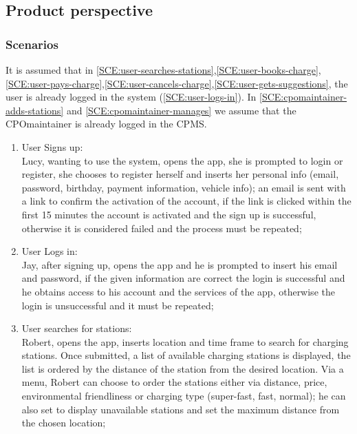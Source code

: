 \subsection{Product perspective}

\subsubsection{Scenarios}
It is assumed that in \ref{SCE:user-searches-stations},\ref{SCE:user-books-charge},\ref{SCE:user-pays-charge},\ref{SCE:user-cancels-charge},\ref{SCE:user-gets-suggestions}, the user is already logged in the system (\ref{SCE:user-logs-in}). In \ref{SCE:cpomaintainer-adds-stations} and \ref{SCE:cpomaintainer-manages} we assume that the \ac{CPO}maintainer is already logged in the \ac{CPMS}.
\begin{enumerate}[label=\textbf{S\arabic*}]
      \item User Signs up:\\
            Lucy, wanting to use the system, opens the app, she is prompted to login or register,
            she chooses to register herself and inserts her personal info (email, password, birthday, payment information, vehicle info);
            an email is sent with a link to confirm the activation of the account, if the link is clicked within
            the first 15 minutes the account is activated and the sign up is successful,
            otherwise it is considered failed and the process must be repeated;\label{SCE:user-signs-up}
      \item User Logs in:\\
            Jay, after signing up, opens the app and he is prompted to insert his email and password,
            if the given information are correct the login is successful and he obtains access to his account
            and the services of the app, otherwise the login is unsuccessful and it must be repeated;\label{SCE:user-logs-in}
      \item User searches for stations:\\
            Robert, opens the app, inserts location and time frame to search for charging stations.
            Once submitted, a list of available charging stations is displayed, the list is ordered by the distance of the station
            from the desired location. Via a menu, Robert can choose to order the stations either via distance, price, environmental friendliness or charging type (super-fast, fast, normal); he can also set to display unavailable stations and set the maximum distance from the chosen location;\label{SCE:user-searches-stations}

\end{enumerate}
